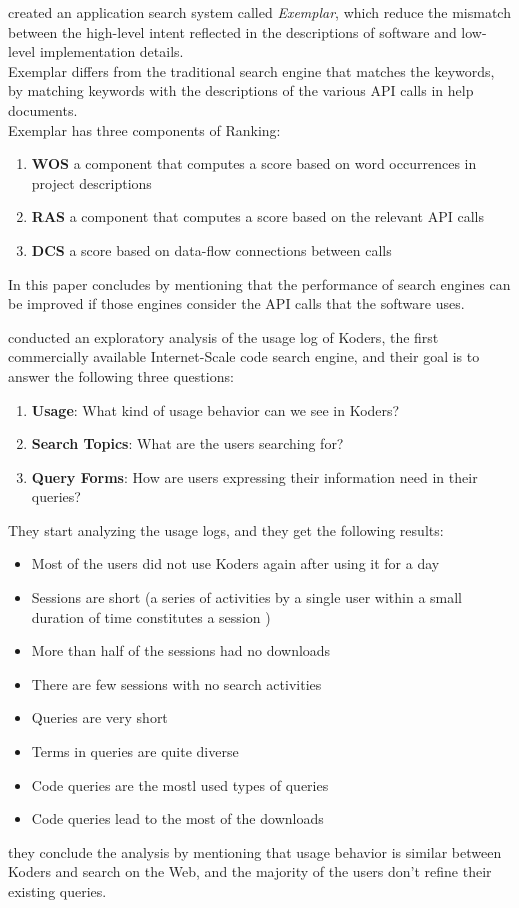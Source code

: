 \documentclass[12pt,mscthesis]{usiinfthesis}
\begin{document}
	\citet{McMillan:2011:FRF:1985793.1986032} created an application search system called \textit{Exemplar}, which reduce the mismatch between the high-level intent reflected in the descriptions of software and low-level implementation details.\\ Exemplar differs from the traditional search engine that matches the keywords, by matching keywords with the descriptions of the various API calls in help documents.\\
	Exemplar has three components of Ranking: 
	\begin{enumerate}
		\item \textbf{WOS} a component that computes a score based on word occurrences in project descriptions
		\item \textbf{RAS} a component that computes a score based on the relevant API calls
		\item \textbf{DCS} a score based on data-flow connections between calls
	\end{enumerate}
	In this paper \citet{McMillan:2011:FRF:1985793.1986032} concludes by mentioning that the performance of search engines can be improved if those engines consider the API calls that the software uses.

	
	\citet{Bajracharya2012} conducted an exploratory analysis of the usage log of Koders, the first commercially available Internet-Scale code search engine, and their goal is to answer the following three questions:\\
	\begin{enumerate}
	\item \textbf{Usage}: What kind of usage behavior can we see in Koders?
	\item \textbf{Search Topics}: What are the users searching for?
	\item \textbf{Query Forms}: How are users expressing their information need in their queries?
	\end{enumerate}
	They start analyzing the usage logs, and they get the following results: 
	\begin{itemize}
	\item Most of the users did not use Koders again after using it for a day
	\item Sessions are short (a series of activities by a single user within a small duration of time constitutes a session )
	\item More than half of the sessions had no downloads
	\item There are few sessions with no search activities
	\item Queries are very short
	\item Terms in queries are quite diverse
	\item Code queries are the mostl used types of queries
	\item Code queries lead to the most of the downloads
	\end{itemize}
	they conclude the analysis by mentioning that usage behavior is similar between Koders and search on the Web, and the majority of the users don't refine their existing queries.\\
	\newpage
	
\end{document}
